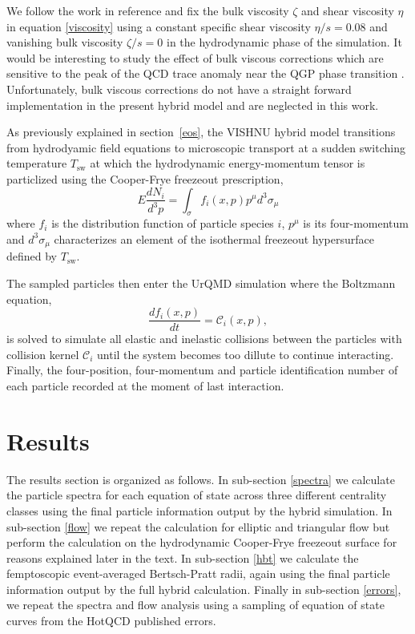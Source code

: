 \documentclass[aps,prc,reprint,amsmath,nofootinbib,superscriptaddress]{revtex4-1}
\begin{document}
We follow the work in reference \cite{?} and fix the bulk viscosity $\zeta$ and shear viscosity $\eta$ in equation \eqref{viscosity} using a constant specific shear viscosity $\eta/s=0.08$ 
and vanishing bulk viscosity $\zeta/s=0$ in the hydrodynamic phase of the simulation. It would be interesting to study the effect of bulk viscous corrections which are sensitive to 
the peak of the QCD trace anomaly near the QGP phase transition \cite{?}. Unfortunately, bulk viscous corrections do not have a straight forward implementation in the present hybrid model 
and are neglected in this work. 

As previously explained in section \,\ref{eos}, the VISHNU hybrid model transitions from hydrodyamic field equations to microscopic transport at a sudden switching temperature $T_\text{sw}$ 
at which the hydrodynamic energy-momentum tensor is particlized using the Cooper-Frye freezeout prescription,
\begin{equation}
 E\frac{dN_i}{d^3p} = \int_\sigma f_i(x,p) p^\mu d^3\sigma_\mu
 \label{cooper-frye}
\end{equation}
where $f_i$ is the distribution function of particle species $i$, $p^\mu$ is its four-momentum and $d^3\sigma_\mu$ characterizes an element of the isothermal freezeout 
hypersurface defined by $T_\text{sw}$.

The sampled particles then enter the UrQMD simulation where the Boltzmann equation, 
\begin{equation}
 \frac{df_i(x,p)}{dt} = \mathcal{C}_i(x,p),
\end{equation}
is solved to simulate all elastic and inelastic collisions between the particles with collision kernel $\mathcal{C}_i$ until the system becomes too dillute to continue interacting. 
Finally, the four-position, four-momentum and particle identification number of each particle recorded at the moment of last interaction. 
 
\section{Results}
\label{results}

The results section is organized as follows. In sub-section \ref{spectra} we calculate the particle spectra for each equation of state across three different centrality classes using the final 
particle information output by the hybrid simulation. In sub-section \ref{flow} we repeat the calculation for elliptic and triangular flow but perform the calculation on the 
hydrodynamic Cooper-Frye freezeout surface for reasons explained later in the text. In sub-section \ref{hbt} we calculate the femptoscopic event-averaged Bertsch-Pratt radii, again using the 
final particle information output by the full hybrid calculation. Finally in sub-section \ref{errors}, we repeat the spectra and flow analysis using a sampling of equation of state curves from the 
HotQCD published errors. 
\end{document}
